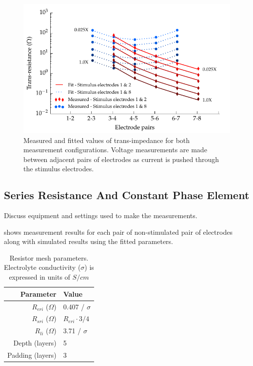       \begin{figure}
        \centering
        \includegraphics{content/pt2/07-InterfaceModel/graphics/graph_transimpedance_pbs}
        \caption{\label{fig:pt2-graph_transimpedance_pbs}Measured and fitted values of trans-impedance for both measurement configurations. Voltage measurements are made between adjacent pairs of electrodes as current is pushed through the stimulus electrodes.}
      \end{figure}

    \subsection{Series Resistance And Constant Phase Element}
        Discuss equipment and settings used to make the measurements.



         shows measurement results for each pair of non-stimulated pair of electrodes along with simulated results using the fitted parameters.


        \begin{table}
          \centering
          \begin{tabular}{r | l}
            Parameter & Value \\
            \hline
            $R_{eri}$ ($\Omega$)& 0.407 / $\sigma$\\
            $R_{sri}$ ($\Omega$)& $R_{eri}\cdot 3/4$\\
            $R_{li}$ ($\Omega$)& 3.71 / $\sigma$ \\
            Depth (layers) & 5 \\
            Padding (layers) & 3 \\
          \end{tabular}
          \caption{\label{tab:RESparams}Resistor mesh parameters. Electrolyte conductivity ($\sigma$) is expressed in units of $S / cm$}
        \end{table}

